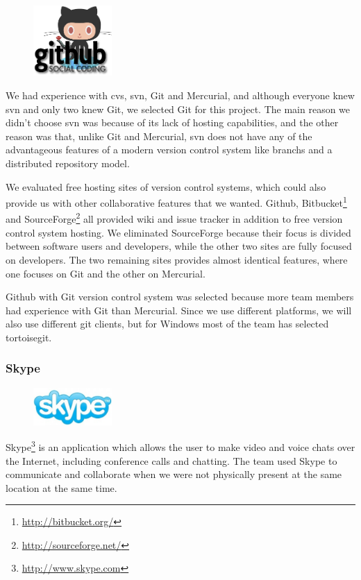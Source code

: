 \begin{figure}
	\vspace{-20pt}
	\includegraphics[width=3cm]{./planning/img/github_logo}
	\vspace{-20pt}
\end{figure}
We had experience with \Gls{cvs}, \Gls{svn}, Git and Mercurial, and although everyone 
knew \Gls{svn} and only two knew Git, we selected Git for this project.
The main reason we didn't choose \Gls{svn} was because of its lack of hosting capabilities,
and the other reason was that, unlike Git and Mercurial, \Gls{svn}	 does not have any of the
advantageous features of a modern \gls{version control system} like \glspl{branch} and a \gls{distributed
repository model}.

We evaluated free hosting sites of \glspl{version control system}, which could also 
provide us with other collaborative features that we wanted. Github, 
Bitbucket\footnote{\url{http://bitbucket.org/}} and
SourceForge\footnote{\url{http://sourceforge.net/}} all provided wiki and
issue tracker in addition to free \gls{version control system} hosting. We eliminated 
SourceForge because their focus is divided between software users and 
developers, while the other two sites are fully focused on developers. The 
two remaining sites provides almost identical features, where one focuses on 
Git and the other on Mercurial.

Github with Git \gls{version control system} was selected because more team members 
had experience with Git than Mercurial. Since we use different platforms,
we will also use different git clients, but for Windows most of the team has
selected tortoisegit.

\subsubsection{Skype}
\begin{figure}
	\vspace{-20pt}
	\includegraphics[width=3cm]{./planning/img/skype_logo}
	\vspace{-20pt}
\end{figure}
Skype\footnote{\url{http://www.skype.com}} is an application which allows the
user to make video and voice chats over the Internet, including conference
calls and chatting. The team used Skype to communicate and collaborate when
we were not physically present at the same location at the same time.

